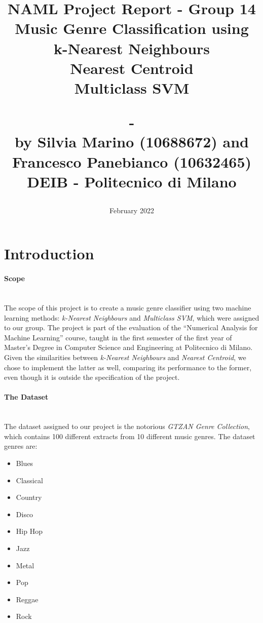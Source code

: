 \documentclass[12pt]{article}
\begin{document}
	\title{NAML Project Report - Group 14\\\vspace{20pt}
		\Large{Music Genre Classification using}\\
		\large{k-Nearest Neighbours\\ Nearest Centroid\\ Multiclass SVM}\\
		\date{February 2022}
		\large{-\\}
		\large{by Silvia Marino (10688672) and Francesco Panebianco (10632465)\\}
		\small{DEIB - Politecnico di Milano}
	}
	\maketitle
	\tableofcontents
	\newpage
	\section{Introduction}
	\paragraph{Scope}\mbox{}\\\newline
	The scope of this project is to create a music genre classifier using two machine learning methods: \textit{k-Nearest Neighbours} and \textit{Multiclass SVM}, which were assigned to our group. The project is part of the evaluation of the “Numerical Analysis for Machine Learning” course, taught in the first semester of the first year of Master’s Degree in Computer Science and Engineering at Politecnico di Milano. Given the similarities between \textit{k-Nearest Neighbours} and \textit{Nearest Centroid}, we chose to implement the latter as well, comparing its performance to the former, even though it is outside the specification of the project.\\ 
	
	\paragraph{The Dataset}\mbox{}\\\newline
	The dataset assigned to our project is the notorious \textit{GTZAN Genre Collection}\cite{marsyas}, which contains 100 different extracts from 10 different music genres. The dataset genres are: 
	
	\begin{itemize}
		\item Blues 
		\item Classical 
		\item Country 
		\item Disco 
		\item Hip Hop 	
		\item Jazz 
		\item Metal 
		\item Pop 
		\item Reggae 
		\item Rock 
	\end{itemize}
\end{document}
